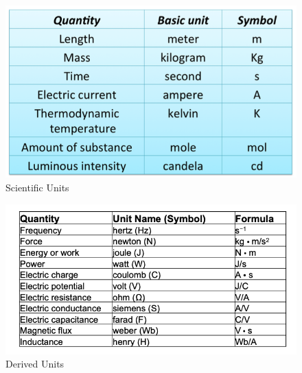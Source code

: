 \documentclass[14pt]{memoir}
\begin{document}
\begin{figure}[h]
\begin{center}
\includegraphics[scale=0.30]{fig/tab01_01.png}
\caption{Scientific Units}
\label{fig:t01_01}
\end{center}
\end{figure}

\begin{figure}[h]
\begin{center}
\includegraphics[scale=0.40]{fig/tab01_02.png}
\caption{Derived Units}
\label{fig:t01_02}
\end{center}
\end{figure}
\end{document}
